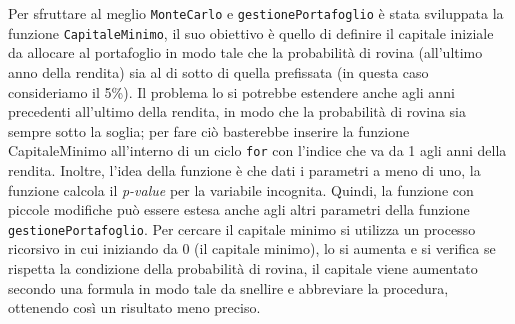 \documentclass[
]{article}
\begin{document}
Per sfruttare al meglio \texttt{MonteCarlo} e
\texttt{gestionePortafoglio} è stata sviluppata la funzione
\texttt{CapitaleMinimo}, il suo obiettivo è quello di definire il
capitale iniziale da allocare al portafoglio in modo tale che la
probabilità di rovina (all'ultimo anno della rendita) sia al di sotto di
quella prefissata (in questa caso consideriamo il 5\%). Il problema lo
si potrebbe estendere anche agli anni precedenti all'ultimo della
rendita, in modo che la probabilità di rovina sia sempre sotto la
soglia; per fare ciò basterebbe inserire la funzione CapitaleMinimo
all'interno di un ciclo \texttt{for} con l'indice che va da 1 agli anni
della rendita. Inoltre, l'idea della funzione è che dati i parametri a
meno di uno, la funzione calcola il \emph{p-value} per la variabile
incognita. Quindi, la funzione con piccole modifiche può essere estesa
anche agli altri parametri della funzione \texttt{gestionePortafoglio}.
Per cercare il capitale minimo si utilizza un processo ricorsivo in cui
iniziando da \(0\) (il capitale minimo), lo si aumenta e si verifica se
rispetta la condizione della probabilità di rovina, il capitale viene
aumentato secondo una formula in modo tale da snellire e abbreviare la
procedura, ottenendo così un risultato meno preciso.
\end{document}
